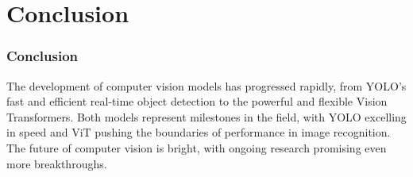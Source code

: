\documentclass{beamer}
\begin{document}

\section{Conclusion}
\begin{frame}
\frametitle{Conclusion}
The development of computer vision models has progressed rapidly, from YOLO’s fast and efficient real-time object detection to the powerful and flexible Vision Transformers. Both models represent milestones in the field, with YOLO excelling in speed and ViT pushing the boundaries of performance in image recognition. The future of computer vision is bright, with ongoing research promising even more breakthroughs.
\end{frame}



\end{document}
